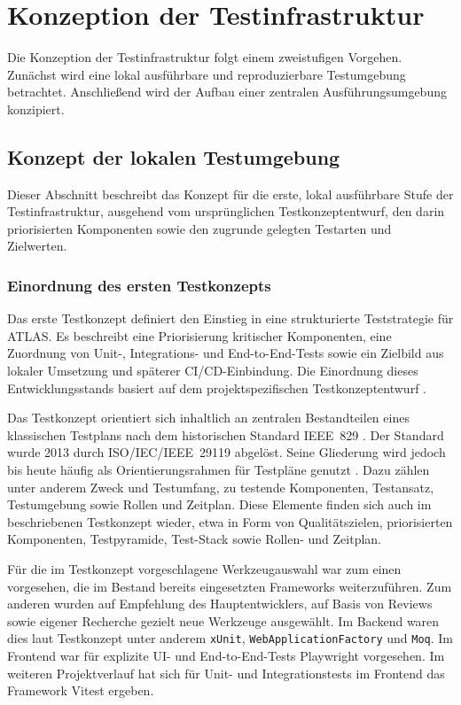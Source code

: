
\chapter{Konzeption der Testinfrastruktur}
\label{chap:konzeption}

Die Konzeption der Testinfrastruktur folgt einem zweistufigen Vorgehen. Zunächst wird eine lokal ausführbare und reproduzierbare Testumgebung betrachtet. Anschließend wird der Aufbau einer zentralen Ausführungsumgebung konzipiert.

\section{Konzept der lokalen Testumgebung}
Dieser Abschnitt beschreibt das Konzept für die erste, lokal ausführbare Stufe der Testinfrastruktur, ausgehend vom ursprünglichen Testkonzeptentwurf, den darin priorisierten Komponenten sowie den zugrunde gelegten Testarten und Zielwerten.


\subsection{Einordnung des ersten Testkonzepts}
Das erste Testkonzept definiert den Einstieg in eine strukturierte Teststrategie für \ac{ATLAS}. Es beschreibt eine Priorisierung kritischer Komponenten, eine Zuordnung von Unit-, Integrations- und End-to-End-Tests sowie ein Zielbild aus lokaler Umsetzung und späterer CI/CD-Einbindung. Die Einordnung dieses Entwicklungsstands basiert auf dem projektspezifischen Testkonzeptentwurf \cite{Pfeil2026Testkonzept}.

Das Testkonzept orientiert sich inhaltlich an zentralen Bestandteilen eines klassischen Testplans nach dem historischen Standard IEEE~829 \autocite{IEEE829}. Der Standard wurde 2013 durch ISO/IEC/IEEE~29119 abgelöst. Seine Gliederung wird jedoch bis heute häufig als Orientierungsrahmen für Testpläne genutzt \autocite{Testriq2024}. Dazu zählen unter anderem Zweck und Testumfang, zu testende Komponenten, Testansatz, Testumgebung sowie Rollen und Zeitplan. Diese Elemente finden sich auch im beschriebenen Testkonzept wieder, etwa in Form von Qualitätszielen, priorisierten Komponenten, Testpyramide, Test-Stack sowie Rollen- und Zeitplan.

Für die im Testkonzept vorgeschlagene Werkzeugauswahl war zum einen vorgesehen, die im Bestand bereits eingesetzten Frameworks weiterzuführen. Zum anderen wurden auf Empfehlung des Hauptentwicklers, auf Basis von Reviews sowie eigener Recherche gezielt neue Werkzeuge ausgewählt. Im Backend waren dies laut Testkonzept unter anderem \texttt{xUnit}, \texttt{WebApplicationFactory} und \texttt{Moq}. Im Frontend war für explizite UI- und End-to-End-Tests Playwright vorgesehen. Im weiteren Projektverlauf hat sich für Unit- und Integrationstests im Frontend das Framework Vitest ergeben.

